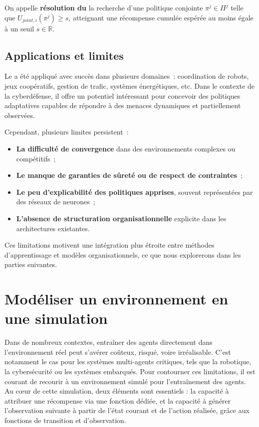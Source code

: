 On appelle \textbf{résolution du } la recherche d'une politique conjointe $\pi^j \in \Pi^j$ telle que $U_{joint,i}(\pi^j) \geq s$, atteignant une récompense cumulée espérée au moins égale à un seuil $s \in \mathbb{R}$.


\subsection{Applications et limites}

Le  a été appliqué avec succès dans plusieurs domaines~: coordination de robots, jeux coopératifs, gestion de trafic, systèmes énergétiques, etc. Dans le contexte de la cyberdéfense, il offre un potentiel intéressant pour concevoir des politiques adaptatives capables de répondre à des menaces dynamiques et partiellement observées.

Cependant, plusieurs limites persistent~:
\begin{itemize}
  \item \textbf{La difficulté de convergence} dans des environnements complexes ou compétitifs~;
  \item \textbf{Le manque de garanties de sûreté ou de respect de contraintes}~;
  \item \textbf{Le peu d'explicabilité des politiques apprises}, souvent représentées par des réseaux de neurones~;
  \item \textbf{L'absence de structuration organisationnelle} explicite dans les architectures existantes.
\end{itemize}

Ces limitations motivent une intégration plus étroite entre méthodes d'apprentissage et modèles organisationnels, ce que nous explorerons dans les parties suivantes.



\section{Modéliser un environnement en une simulation}

Dans de nombreux contextes, entraîner des agents directement dans l’environnement réel peut s’avérer coûteux, risqué, voire irréalisable. C’est notamment le cas pour les systèmes multi-agents critiques, tels que la robotique, la cybersécurité ou les systèmes embarqués. Pour contourner ces limitations, il est courant de recourir à un environnement simulé pour l’entraînement des agents. Au cœur de cette simulation, deux éléments sont essentiels : la capacité à attribuer une récompense via une fonction dédiée, et la capacité à générer l’observation suivante à partir de l’état courant et de l’action réalisée, grâce aux fonctions de transition et d’observation.

